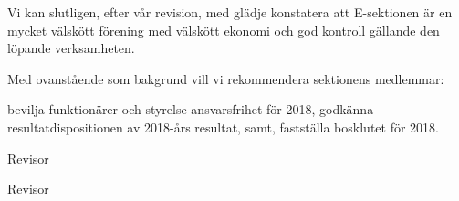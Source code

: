 \documentclass[../_main/handlingar.tex]{subfiles}
\begin{document}
Vi kan slutligen, efter vår revision, med glädje konstatera att E-sektionen är en mycket välskött förening med välskött ekonomi och god kontroll gällande den löpande verksamheten.

Med ovanstående som bakgrund vill vi rekommendera sektionens medlemmar:
\begin{attsatser}
    \att bevilja funktionärer och styrelse ansvarsfrihet för 2018,
    \att godkänna resultatdispositionen av 2018-års resultat, samt,
    \att fastställa bosklutet för 2018.
\end{attsatser}

\begin{signatures}{2}
    \mvh
    \signature{Fredrik Peterson}{Revisor}
    \signature{Anders Nilsson}{Revisor}
\end{signatures}
\end{document}
